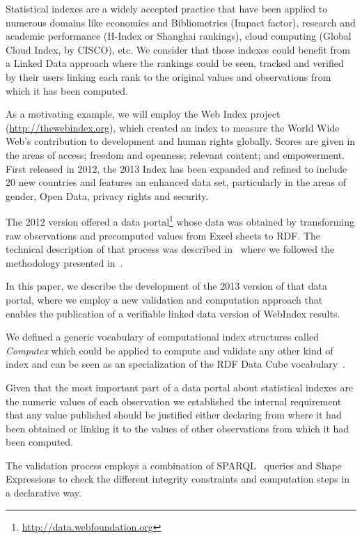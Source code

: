 \documentclass{llncs}
\newcommand{\footnoteUrl}[1]{\footnote{\url{#1}}}
\begin{document}
Statistical indexes are a widely accepted practice that have been applied 
to numerous domains like economics and Bibliometrics (Impact factor), 
research and academic performance (H-Index or Shanghai rankings), 
cloud computing (Global Cloud Index, by CISCO), 
etc. 
We consider that those indexes could benefit from a 
 Linked Data approach where the rankings could be seen, tracked and 
 verified by their users linking each rank to the original values and observations 
 from which it has been computed.

As a motivating example, we will employ the Web Index project
(\url{http://thewebindex.org}), which created an index to measure the World Wide Web’s 
contribution to development and human rights globally. Scores are given in the areas of access; freedom and openness; relevant content; and empowerment. 
First released in 2012, the 2013 Index has been expanded and refined to include 20 new countries and features an enhanced data set, particularly in the areas of gender, Open Data, privacy rights and security.

The 2012 version offered a data
portal\footnoteUrl{http://data.webfoundation.org} whose data was obtained 
by transforming raw observations and precomputed values 
from Excel sheets to RDF. 
The technical description of that process was described in~\cite{Alvarez13} where we followed
the methodology presented in~\cite{Silva11}. 

In this paper, we describe the development of the 2013 version of that data portal, where we employ 
a new validation and computation approach that enables the publication of a verifiable linked data version of WebIndex results.

We defined a generic vocabulary 
of computational index structures called \emph{Computex} which could be applied to compute 
and validate any other kind of index and can be seen as an specialization of the RDF Data Cube vocabulary~\cite{Cube}.

Given that the most important part of a data portal about statistical indexes are the 
numeric values of each observation we established the internal requirement that any value published should be justified either declaring from where it had been obtained or
linking it to the values of other observations
from which it had been computed.

The validation process employs a combination of SPARQL~\cite{SPARQL11} queries and Shape Expressions \cite{Boneva2014} to check the 
 different integrity constraints and computation steps in a declarative way.
\end{document}
